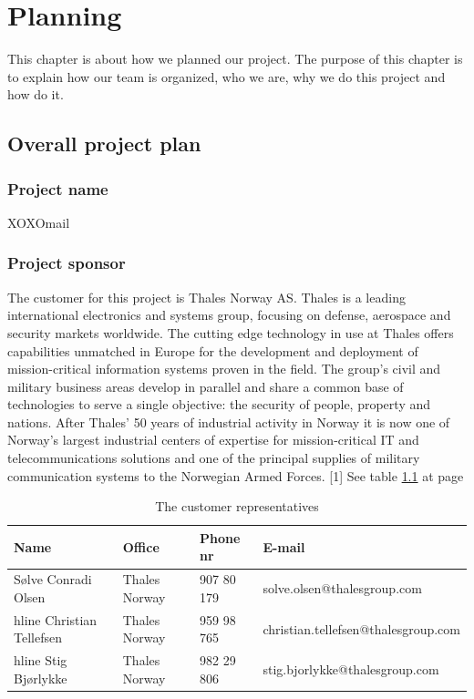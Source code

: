 \chapter{Planning}

This chapter is about how we planned our project. The purpose of this chapter is to explain how our team is organized, who we are, why we do this project and how do it.

\section{Overall project plan}

\subsection{Project name}
XOXOmail

\subsection{Project sponsor}

The customer for this project is Thales Norway AS. Thales is a leading international electronics and systems group, focusing on defense, aerospace and security markets worldwide. The cutting edge technology in use at Thales offers capabilities unmatched in Europe for the development and deployment of mission-critical information systems proven in the field. The group’s civil and military business areas develop in parallel and share a common base of technologies to serve a single objective: the security of people, property and nations.
\newline
\newline
After Thales’ 50 years of industrial activity in Norway it is now one of Norway’s largest industrial centers of expertise for mission-critical IT and telecommunications solutions and one of the principal supplies of military communication systems to the Norwegian Armed Forces. [1]
\newline
\newline
See table \ref{tab:customer} at page \pageref{tab:customer}
\begin{table}
\begin{tabular}{l|l|l|l}
\textbf{Name} & \textbf{Office} & \textbf{Phone nr} & \textbf{E-mail} \\ \hline \hline
Sølve Conradi Olsen & Thales Norway & 907 80 179 & solve.olsen@thalesgroup.com \\ hline
Christian Tellefsen & Thales Norway & 959 98 765 & christian.tellefsen@thalesgroup.com \\ hline
Stig Bjørlykke & Thales Norway & 982 29 806 & stig.bjorlykke@thalesgroup.com
\end{tabular}
\caption{The customer representatives} \label{tab:customer}
\end{table}

